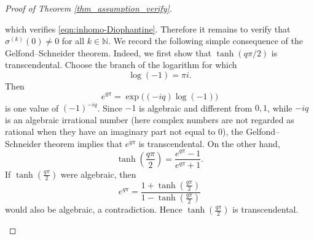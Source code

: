 \documentclass{article}
\numberwithin{equation}{section}
\def\NN{\mathbb{N}}
\begin{document}
\begin{proof}[Proof of Theorem \ref{thm_assumption_verify}]
\begin{enumerate}
\begin{equation}
        \end{equation}
        which verifies \eqref{eqn:inhomo-Diophantine}. Therefore it remains to verify that $\sigma^{(k)}(0)\neq 0$ for all $k\in\NN$. We record the following simple consequence of the Gelfond--Schneider theorem. 
        Indeed, we first show that \(\tanh(q\pi/2)\) is transcendental. Choose the branch of the logarithm for which
        \[
        \log(-1)=\pi i.
        \]
        Then
        \[
        e^{q\pi}
        =
        \exp\bigl((-iq)\log(-1)\bigr)
        \]
        is one value of \((-1)^{-iq}\). Since \(-1\) is algebraic and different from \(0,1\), while \(-iq\) is an algebraic irrational number (here complex numbers are not regarded as rational when they have an imaginary part not equal to 0), the Gelfond--Schneider theorem implies that
        \(
        e^{q\pi}
        \)
        is transcendental. On the other hand,
        \[
        \tanh(\frac{q\pi}{2})=\frac{e^{q\pi}-1}{e^{q\pi}+1}.
        \]
        If \(\tanh(\frac{q\pi}{2})\) were algebraic, then
        \[
        e^{q\pi}
        =
        \frac{1+\tanh(\frac{q\pi}{2})}{1-\tanh(\frac{q\pi}{2})}
        \]
        would also be algebraic, a contradiction. Hence \(\tanh(\frac{q\pi}{2})\) is transcendental.
        

\end{enumerate}
\end{proof}
\end{document}
